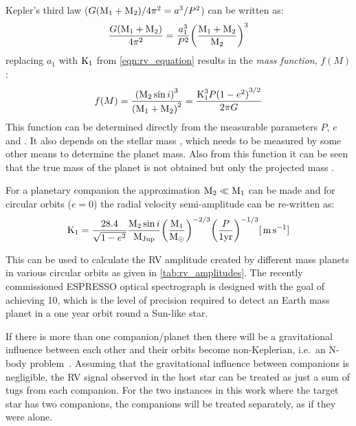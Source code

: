 Kepler's third law (\({G (\mone + \mtwo)}/{4\pi^{2}}= {a}^{3}/{P}^{2}\)) can be written as:
\begin{equation}
    \frac{G (\mone + \mtwo)}{4\pi^{2}} = \frac{a_{1}^{3}}{P^{2}}{\left(\frac{\mone + \mtwo}{\mtwo}\right)}^{3}
\end{equation}
replacing $a_{1}$ with $\kone$ from \cref{eqn:rv_equation} results in the \emph{mass function}, $f(M)$:
\begin{equation}
    f(M) = \frac{{(\mtwosini)}^{3}}{{(\mone + \mtwo)}^{2}} = \frac{\kone^{3} P {(\oneminusetwo)}^{3/2}}{2 \pi G} \label{eqn:mass_function}
\end{equation}
This function can be determined directly from the measurable parameters $P$, $e$ and \Kone{}.
It also depends on the stellar mass \Mone{}, which needs to be measured by some other means to determine the planet mass.
Also from this function it can be seen that the true mass of the planet \Mtwo{} is not obtained but only the projected mass \Mtwosini{}.

For a planetary companion the approximation $\mtwo \ll \mone$ can be made and for circular orbits ($e=0$) the radial velocity semi-amplitude can be re-written as:
\begin{equation}
    \kone = \frac{28.4}{\sqrt{\oneminusetwo}} \frac{\mtwosini}{\mjup} {\left(\frac{\mone}{\modot}\right)}^{-2/3} {\left(\frac{P}{1 \si{yr}}\right)}^{-1/3}  [\mps] \label{eqn:k_relation}
\end{equation}

This can be used to calculate the RV amplitude created by different mass planets in various circular orbits as given in \cref{tab:rv_amplitudes}. The recently commissioned ESPRESSO optical spectrograph is designed with the goal of achieving 10\cmps{}, which is the level of precision required to detect an Earth mass planet in a one year orbit round a Sun-like star.



If there is more than one companion/planet then there will be a gravitational influence between each other and their orbits become non-Keplerian, i.e.\ an N-body problem~\citep[e.g.][]{chenciner_three_2007}.
Assuming that the gravitational influence between companions is negligible, the RV signal observed in the host star can be treated as just a sum of tugs from each companion.
For the two instances in this work where the target star has two companions, the companions will be treated separately, as if they were alone.


